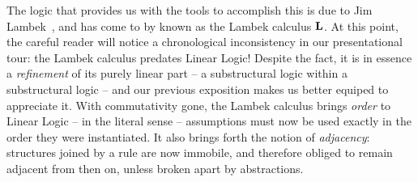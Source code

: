 The logic that provides us with the tools to accomplish this is due to Jim Lambek~\cite{lambek1958mathematics}, and has come to by known as the Lambek calculus $\textbf{L}$.
At this point, the careful reader will notice a chronological inconsistency in our presentational tour: the Lambek calculus predates Linear Logic! Despite the fact, it is in essence a \textit{refinement} of its purely linear part -- a substructural logic within a substructural logic -- and our previous exposition makes us better equiped to appreciate it.
With commutativity gone, the Lambek calculus brings \textit{order} to Linear Logic -- in the literal sense -- assumptions must now be used exactly in the order they were instantiated.
It also brings forth the notion of \textit{adjacency}: structures joined by a rule are now immobile, and therefore obliged to remain adjacent from then on, unless broken apart by abstractions.


